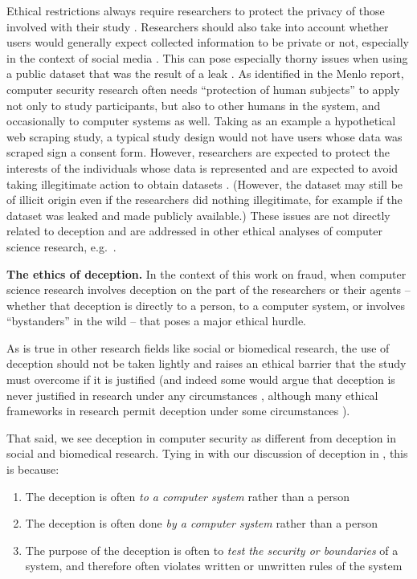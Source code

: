 Ethical restrictions always require researchers to protect the privacy of those involved with their study \cite{menloReport,ethicsOfOnlineResearch,alllmanIssuesEtiquetteConcerning2007}.
Researchers should also take into account whether users would generally expect collected information to be private or not, especially in the context of social media \cite{ethicsOfOnlineResearch}.
This can pose especially thorny issues when using a public dataset that was the result of a leak \cite{thomasEthicalIssuesResearch2017}.
As identified in the Menlo report, computer security research often needs ``protection of human subjects'' to apply not only to study participants, but also to other humans in the system, and occasionally to computer systems as well.
Taking as an example a hypothetical web scraping study, a typical study design would not have users whose data was scraped sign a consent form.
However,  researchers are expected to protect the interests of the individuals whose data is represented and are expected to avoid taking illegitimate action to obtain datasets \cite{menloReport}. (However, the dataset may still be of illicit origin even if the researchers did nothing illegitimate, for example if the dataset was leaked and made publicly available.) These issues are not directly related to deception and are addressed in other ethical analyses of computer science research, e.g.\ \cite{thomasEthicalIssuesResearch2017,partridgeEthicalConsiderationsNetwork2016,menloReport,cranorConferenceSubmissionReview}.

\textbf{The ethics of deception.}
In the context of this work on fraud, when computer science research involves deception on the part of the researchers or their agents -- whether that deception is directly to a person, to a computer system, or involves ``bystanders'' in the wild -- that poses a major ethical hurdle.

As is true in other research fields like social or biomedical research, the use of deception should not be taken lightly and raises an ethical barrier that the study must overcome if it is justified (and indeed some would argue that deception is never justified in research under any circumstances \cite{baumrindResearchUsingIntentional1985,meadResearchHumanBeings}, although many ethical frameworks in research permit deception under some circumstances \cite{findleyObligatedDeceiveAliases2016,goodeEthicsDeceptionSocial1996,InformedConsentFAQs,belmontReport,wendlerDeceptionPursuitScience2004}).

That said,
we see deception in computer security as  different from deception in social and biomedical research.  Tying in with our discussion of deception in , this is because:
\begin{enumerate}
\item The deception is often \emph{to a computer system} rather than a person
\item The deception is often done \emph{by a computer system} rather than a person
\item The purpose of the deception is often to \emph{test the security or boundaries} of a system, and therefore often violates written or unwritten rules of the system
\end{enumerate}

